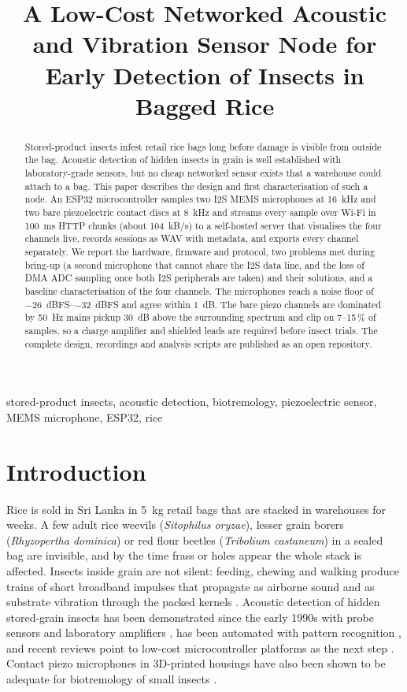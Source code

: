 \documentclass[conference]{IEEEtran}
\title{A Low-Cost Networked Acoustic and Vibration Sensor Node for Early Detection of Insects in Bagged Rice}
\author{\IEEEauthorblockN{Dilan Perera}
\IEEEauthorblockA{Intelligent Systems \& Mechatronics Research Laboratory (ISMR Labs)\\
Colombo, Sri Lanka\\
\url{https://github.com/ISMR-Labs/grain-acoustics}}}
\begin{document}
\maketitle

\begin{abstract}
Stored-product insects infest retail rice bags long before damage is visible from outside the bag. Acoustic detection of hidden insects in grain is well established with laboratory-grade sensors, but no cheap networked sensor exists that a warehouse could attach to a bag. This paper describes the design and first characterisation of such a node. An ESP32 microcontroller samples two I2S MEMS microphones at \SI{16}{kHz} and two bare piezoelectric contact discs at \SI{8}{kHz} and streams every sample over Wi-Fi in \SI{100}{ms} HTTP chunks (about \SI{104}{kB/s}) to a self-hosted server that visualises the four channels live, records sessions as WAV with metadata, and exports every channel separately. We report the hardware, firmware and protocol, two problems met during bring-up (a second microphone that cannot share the I2S data line, and the loss of DMA ADC sampling once both I2S peripherals are taken) and their solutions, and a baseline characterisation of the four channels. The microphones reach a noise floor of \SIrange{-26}{-32}{dBFS} and agree within \SI{1}{dB}. The bare piezo channels are dominated by \SI{50}{Hz} mains pickup \SI{30}{dB} above the surrounding spectrum and clip on 7--15\,\% of samples, so a charge amplifier and shielded leads are required before insect trials. The complete design, recordings and analysis scripts are published as an open repository.
\end{abstract}

\begin{IEEEkeywords}
stored-product insects, acoustic detection, biotremology, piezoelectric sensor, MEMS microphone, ESP32, rice
\end{IEEEkeywords}

\section{Introduction}
Rice is sold in Sri Lanka in \SI{5}{kg} retail bags that are stacked in warehouses for weeks. A few adult rice weevils (\emph{Sitophilus oryzae}), lesser grain borers (\emph{Rhyzopertha dominica}) or red flour beetles (\emph{Tribolium castaneum}) in a sealed bag are invisible, and by the time frass or holes appear the whole stack is affected. Insects inside grain are not silent: feeding, chewing and walking produce trains of short broadband impulses that propagate as airborne sound and as substrate vibration through the packed kernels \cite{mankin2011,hill2016}. Acoustic detection of hidden stored-grain insects has been demonstrated since the early 1990s with probe sensors and laboratory amplifiers \cite{hagstrum1993,shuman1993}, has been automated with pattern recognition \cite{potamitis2009,eliopoulos2015}, and recent reviews point to low-cost microcontroller platforms as the next step \cite{mankin2021}. Contact piezo microphones in 3D-printed housings have also been shown to be adequate for biotremology of small insects \cite{gjonov2025}.
\end{document}
